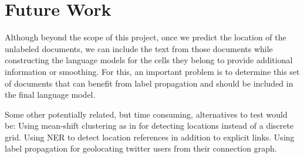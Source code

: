 \documentclass[11pt]{article}
\begin{document}
\section{Future Work}

Although beyond the scope of this project, once we predict the location of the unlabeled documents, we can include the text from those documents
while constructing the language models for the cells they belong to provide additional information or smoothing. For this, an important problem is to 
determine this set of documents that can benefit from label propagation and should be included in the final language model.

Some other potentially related, but time consuming, alternatives to test would be:
Using mean-shift clustering as in \cite{Grauman} for detecting locations instead of a discrete grid.
Using NER to detect location references in addition to explicit links.
Using label propagation for geolocating twitter users from their connection graph.




\end{document}
